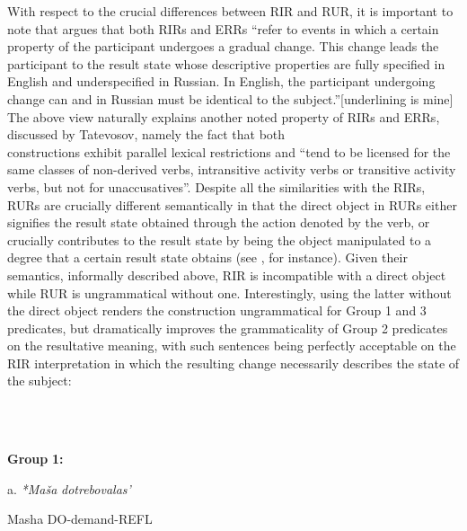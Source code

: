 \documentclass[output=paper,modfonts, nonflat]{langsci/langscibook}
\begin{document}
With respect to the crucial differences between RIR and RUR, it is important to note that \citet{Tatevosov2010} argues that both RIRs and ERRs “refer to events in which a certain property of the participant undergoes a gradual change. This change leads the participant to the result state whose descriptive properties are fully specified in English and underspecified in Russian. In English, the participant undergoing change can and in Russian must be identical to the subject.”[underlining is mine] The above view naturally explains another noted property of RIRs and ERRs, discussed by Tatevosov, namely the fact that both\\
constructions exhibit parallel lexical restrictions and “tend to be licensed for the same classes of non-derived verbs, intransitive activity verbs or transitive activity verbs, but not for unaccusatives”. Despite all the similarities with the RIRs, RURs are crucially different semantically in that the direct object in RURs either signifies the result state obtained through the action denoted by the verb, or crucially contributes to the result state by being the object manipulated to a degree that a certain result state obtains (see , for instance). Given their semantics, informally described above, RIR is incompatible with a direct object while RUR is ungrammatical without one. Interestingly, using the latter without the direct object renders the construction ungrammatical for Group 1 and 3 predicates, but dramatically improves the grammaticality of Group 2 predicates on the resultative meaning, with such sentences being perfectly acceptable on the RIR interpretation in which the resulting change necessarily describes the state of the subject:

\begin{styleinnerExample}
\ea%
    \label{ex:key:44}
    \gll\\
        \\
    \glt
    \z

          \textbf{Group} \textbf{1:}
\end{styleinnerExample}

\begin{styleinnerExample}
  a.  \textit{*Maša}   \textit{dotrebovalas’} 
\end{styleinnerExample}

\begin{styleinnerExample}
     Masha   DO-demand-REFL\\\end{styleinnerExample}
\end{document}
